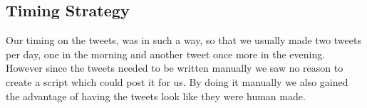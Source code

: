 \subsection{Timing Strategy}
Our timing on the tweets, was in such a way, so that we usually made two tweets per day, one in the morning and another tweet once more in the evening. However since the tweets needed to be written manually we saw no reason to create a script which could post it for us. By doing it manually we also gained the advantage of having the tweets look like they were human made.
